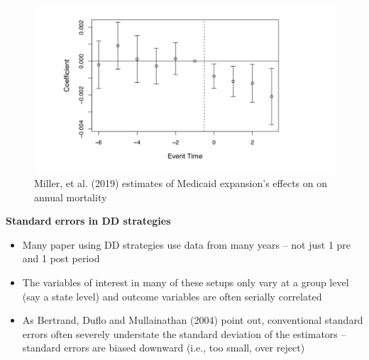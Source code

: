 \documentclass[notes=show]{beamer}
\begin{document}
\begin{frame}[plain]

	\begin{figure}
	\includegraphics[scale=0.3]{./lecture_includes/Miller_Medicaid4}
	\caption{Miller, et al. (2019) estimates of Medicaid expansion's effects on on annual mortality}
	\end{figure}

\end{frame}

\begin{frame}[plain]
	\begin{center}
	\textbf{Standard errors in DD strategies}
	\end{center}
	
	\begin{itemize}
	\item Many paper using DD strategies use data from many years -- not just 1 pre and 1 post period
	\item The variables of interest in many of these setups only vary at a group level (say a state level) and outcome variables are often serially correlated
	\item As Bertrand, Duflo and Mullainathan (2004) point out, conventional standard errors often severely understate the standard deviation of the estimators -- standard errors are biased downward (i.e., too small, over reject)
	\end{itemize}
\end{frame}
\end{document}
